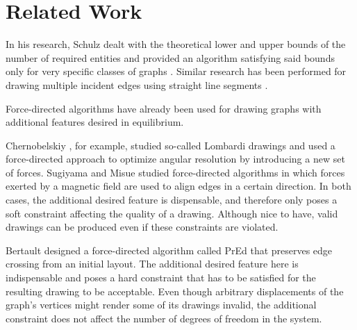 \section{Related Work}
\label{sect:related-work}

In his research, Schulz dealt with the theoretical lower and upper bounds of the number of required entities and provided an algorithm satisfying said bounds only for very specific classes of graphs \cite{Schulz}. Similar research has been performed for drawing multiple incident edges using straight line segments \cite{Dujmovic, Durocher, Igamberdiev}.

Force-directed algorithms have already been used for drawing graphs with additional features desired in equilibrium.

Chernobelskiy \etal{} \cite{Chernobelskiy}, for example, studied so-called Lombardi drawings and used a force-directed approach to optimize angular resolution by introducing a new set of forces. Sugiyama and Misue \cite{Sugiyama} studied force-directed algorithms in which forces exerted by a magnetic field are used to align edges in a certain direction. In both cases, the additional desired feature is dispensable, and therefore only poses a soft constraint affecting the quality of a drawing. Although nice to have, valid drawings can be produced even if these constraints are violated.

Bertault \cite{Bertault} designed a force-directed algorithm called PrEd that preserves edge crossing from an initial layout. The additional desired feature here is indispensable and poses a hard constraint that has to be satisfied for the resulting drawing to be acceptable. Even though arbitrary displacements of the graph's vertices might render some of its drawings invalid, the additional constraint does not affect the number of degrees of freedom in the system.
